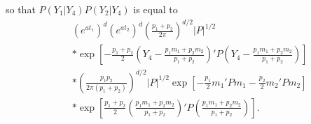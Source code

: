 \documentclass[12pt]{article}
\begin{document}
so that $P(Y_1 | Y_4) P(Y_2 | Y_4 )$ is equal to
\begin{eqnarray}
& & (e^{at_1})^d (e^{at_2})^d  \left( \frac{p_1 + p_2}{2 \pi} \right) ^{d/2} |P|^{1/2} \\
& & * \exp \left[ -\frac{p_1 + p_2}{2} \left( Y_4  - \frac{p_1 m_1 + p_2 m_2}{p_1 + p_2} \right)' P  \left( Y_4  - \frac{p_1 m_1 + p_2 m_2}{p_1 + p_2} \right) \right] \\
& & * \left( \frac{p_1 p_2}{2 \pi (p_1 + p_2)} \right)^{d/2}  |P|^{1/2} \exp \left[ -\frac{p_1}{2} m_1' P m_1 -\frac{p_2}{2}m_2'P m_2  \right] \\
& & * \exp \left[ \frac{p_1 + p_2}{2} \left(  \frac{p_1 m_1 + p_2 m_2}{p_1 + p_2} \right)' P    
\left(  \frac{p_1 m_1 + p_2 m_2}{p_1 + p_2} \right)  \right] .
\end{eqnarray}
\end{document}
